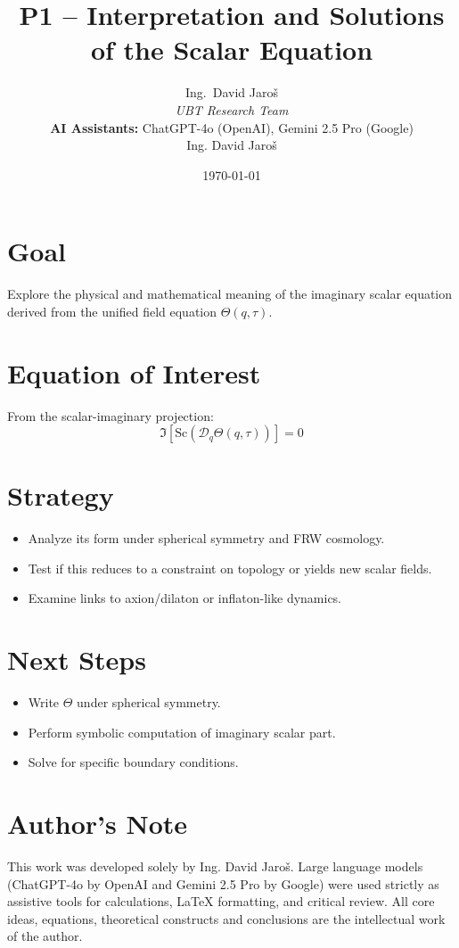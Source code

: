 \documentclass[12pt]{article}
\title{P1 – Interpretation and Solutions of the Scalar Equation}
\author{
Ing.~David Jaroš \\
\textit{UBT Research Team} \\
\textbf{AI Assistants:} ChatGPT-4o (OpenAI), Gemini 2.5 Pro (Google) \\
Ing. David Jaroš}
\date{\today}
\begin{document}
\maketitle

\section*{Goal}
Explore the physical and mathematical meaning of the imaginary scalar equation derived from the unified field equation $\Theta(q, \tau)$.

\section*{Equation of Interest}
From the scalar-imaginary projection:
\[
\Im[\text{Sc}(\mathcal{D}_q \Theta(q, \tau))] = 0
\]

\section*{Strategy}
\begin{itemize}
\item Analyze its form under spherical symmetry and FRW cosmology.
\item Test if this reduces to a constraint on topology or yields new scalar fields.
\item Examine links to axion/dilaton or inflaton-like dynamics.
\end{itemize}

\section*{Next Steps}
\begin{itemize}
\item Write $\Theta$ under spherical symmetry.
\item Perform symbolic computation of imaginary scalar part.
\item Solve for specific boundary conditions.
\end{itemize}


\section*{Author's Note}

This work was developed solely by Ing. David Jaroš.  
Large language models (ChatGPT-4o by OpenAI and Gemini 2.5 Pro by Google) were used strictly as assistive tools for calculations, LaTeX formatting, and critical review.  
All core ideas, equations, theoretical constructs and conclusions are the intellectual work of the author.
\end{document}
